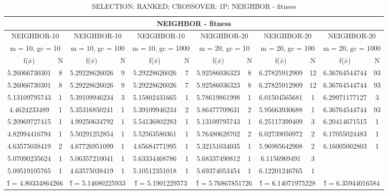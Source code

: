 \begin{table}[H]
	\centering
	\caption{SELECTION: RANKED; CROSSOVER: 1P: NEIGHBOR - fitness}
	\begin{adjustbox}{width=1\textwidth}
		\begin{tabular}{ |c|c||c|c||c|c||c|c||c|c||c|c| }
			\hline
			\multicolumn{12}{|c|}{NEIGHBOR - fitness} \\
			\hline
			\multicolumn{2}{|c||}{NEIGHBOR-10} & \multicolumn{2}{c||}{NEIGHBOR-10} & \multicolumn{2}{c||}{NEIGHBOR-10} & \multicolumn{2}{c||}{NEIGHBOR-20} & \multicolumn{2}{c||}{NEIGHBOR-20} & \multicolumn{2}{c|}{NEIGHBOR-20}\\
			\hline
			\multicolumn{2}{|c||}{m = 10, gc = 10} & \multicolumn{2}{c||}{m = 10, gc = 100} & \multicolumn{2}{c||}{m = 10, gc = 1000} & \multicolumn{2}{c||}{m = 20, gc = 10} & \multicolumn{2}{c||}{m = 20, gc = 100} & \multicolumn{2}{c|}{m = 20, gc = 1000}\\
			\hline
			f($\bar{x}$) & N & f($\bar{x}$) & N & f($\bar{x}$) & N & f($\bar{x}$) & N & f($\bar{x}$) & N & f($\bar{x}$) & N\\
			\hline
			\hline
			5.26066730301 & 8 & 5.29228626026 & 9 & 5.29228626026 & 7 & 5.92586036323 & 8 & 6.27825912909 & 12 & 6.36764544744 & 93\\
			\hline
			5.26066730301 & 8 & 5.29228626026 & 9 & 5.29228626026 & 7 & 5.92586036323 & 8 & 6.27825912909 & 12 & 6.36764544744 & 93\\
			5.13109795743 & 1 & 5.39109946234 & 3 & 5.15802431665 & 1 & 5.78619861998 & 1 & 6.01504565681 & 1 & 6.29971177127 & 3\\
			4.4624233489 & 1 & 5.35316850241 & 1 & 5.39109946234 & 2 & 5.86477709631 & 2 & 5.95663930688 & 1 & 6.36764544744 & 93\\
			5.20969727415 & 1 & 4.99250634792 & 1 & 5.54136802283 & 1 & 5.13109795743 & 1 & 6.25117399409 & 3 & 6.20414671515 & 1\\
			4.82994416794 & 1 & 5.50291252854 & 1 & 5.52563580361 & 1 & 5.76480628702 & 2 & 6.02739050972 & 2 & 6.17055024483 & 1\\
			4.63575038419 & 2 & 4.67726951099 & 1 & 4.65684771995 & 1 & 5.32151034035 & 1 & 5.96985642908 & 2 & 6.16005002803 & 1\\
			5.07090235624 & 1 & 5.06357210041 & 1 & 5.63334468786 & 1 & 5.68337490812 & 1 & 6.1156969491 & 3 &   &  \\
			5.09519105765 & 1 & 4.63575038419 & 1 & 5.10512351018 & 1 & 5.69374053454 & 1 & 6.12201246765 & 1 &   &  \\
			\hline
			\multicolumn{2}{|c||}{\^{f} = 4.80334864266} & \multicolumn{2}{c||}{\^{f} = 5.14680225933} & \multicolumn{2}{c||}{\^{f} = 5.1901229573} & \multicolumn{2}{c||}{\^{f} = 5.76867851726} & \multicolumn{2}{c||}{\^{f} = 6.14071975228} & \multicolumn{2}{c|}{\^{f} = 6.35944016584}\\
			\hline
		\end{tabular}
	\end{adjustbox}
\end{table}

